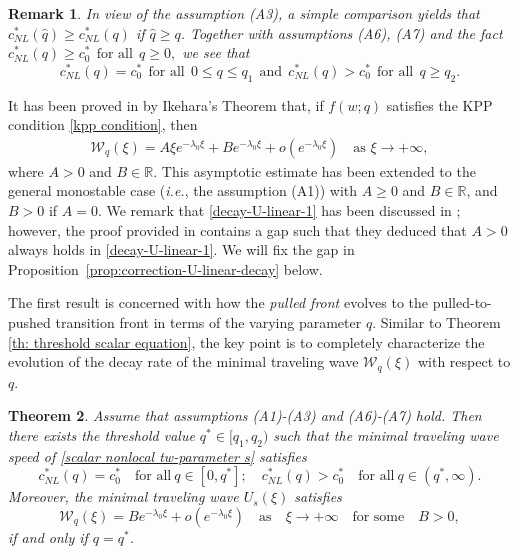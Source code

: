 \documentclass[11pt,a4paper]{article}
\newtheorem{theorem}{\textbf{Theorem}}[section]
\newtheorem{remark}[theorem]{\textbf{Remark}}
\numberwithin{equation}{section}
\numberwithin{figure}{section}
\newcommand\bea{\begin{eqnarray}}
\newcommand\eea{\end{eqnarray}}
\begin{document}
\begin{remark}\label{rk:a6+a7}
In view of the assumption  (A3), a simple comparison yields that $c_{NL}^*(\hat{q})\geq c_{NL}^*(q)$ if $\hat{q}\geq q$.
Together with assumptions (A6), (A7) and the fact 
$c_{NL}^*(q)\geq c^*_0\ \ \text{for all}\ \ q\geq0,$
we see that
$$c_{NL}^*(q)=c^*_0\ \ \text{for all}\ \ 0\leq q\leq q_1\ \ \text{and}\ \ c_{NL}^*(q)>c^*_0\ \ \text{for all}\ \ q\geq q_2.$$
\end{remark}


It has been proved in \cite{Carr Chmaj} by Ikehara's Theorem that, if $f(w;q)$ satisfies the KPP condition \eqref{kpp condition}, then
\bea\label{decay-U-linear-1}
\mathcal{W}_q(\xi)=A\xi e^{-\lambda_0\xi}+Be^{-\lambda_0\xi}+o(e^{-\lambda_0\xi})\quad \mbox{as $\xi\to+\infty$},
\eea
where $A>0$ and $B\in \mathbb{R}$.
This asymptotic estimate %
has been extended to the general monostable case ({\it i.e.}, the assumption (A1)) %
with $A\geq0$ and $B\in \mathbb{R}$,
and $B>0$ if $A=0$.
We remark that \eqref{decay-U-linear-1}  has been discussed in
\cite{Coville}; however, the proof provided in \cite[Theorem 1.6]{Coville} contains a gap such that they deduced that $A>0$ always holds in \eqref{decay-U-linear-1}.
We will fix the gap in Proposition~\ref{prop:correction-U-linear-decay} below.





The first result is concerned with how the {\em pulled front} %
evolves to the pulled-to-pushed transition front in terms of the varying parameter $q$. Similar to Theorem \ref{th: threshold scalar equation}, the key point is to completely characterize the evolution of the decay rate of the minimal traveling wave $\mathcal{W}_q(\xi)$ with respect to $q$.

\begin{theorem}\label{th: threshold scalar equation nonlocal}
Assume that assumptions (A1)-(A3) and (A6)-(A7) hold. Then there exists the threshold value $q^*\in[q_1,q_2)$ such that the minimal traveling wave speed of \eqref{scalar nonlocal tw-parameter s} satisfies
\begin{equation}\label{def of threshold scalar nonlocal}
c_{NL}^*(q)=c_0^*\quad\text{for all}\ q\in[0,q^*];\quad c_{NL}^*(q)>c_0^*\quad\text{for all}\ q\in(q^*,\infty).
\end{equation}
Moreover,
the minimal traveling wave $U_s(\xi)$ satisfies %
\begin{equation}\label{asy tw threshold scalar nonlocal}
\mathcal{W}_q(\xi)=Be^{-\lambda_0\xi}+o(e^{-\lambda_0\xi})\quad \mbox{as}\quad \xi\to+\infty\quad\text{for some}\quad B>0,
\end{equation}
if and only if $q=q^*$.
\end{theorem}
\end{document}
